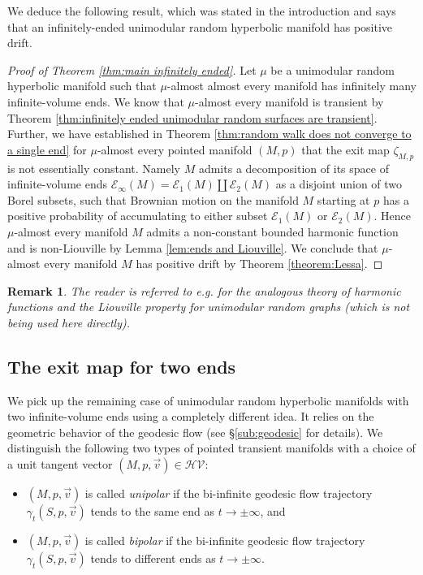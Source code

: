 \documentclass{amsart}
\newcommand{\HypersV}{\mathcal{HV}}
\newcommand{\EndsInf}[1]{\mathcal{E}_{\infty}\left(#1\right)}
\theoremstyle{plain}
\newtheorem{remark}[theorem]{Remark}
\numberwithin{equation}{section}
\theoremstyle{definition}
\begin{document}
We deduce the following result, which was stated in the introduction and says that an infinitely-ended unimodular random hyperbolic manifold has positive drift.

\begin{proof}[Proof of Theorem \ref{thm:main infinitely ended}]
Let $\mu$ be a unimodular random hyperbolic manifold such that  $\mu$-almost almost every manifold has infinitely many infinite-volume ends. We know that $\mu$-almost every manifold is transient by Theorem \ref{thm:infinitely ended unimodular random surfaces are transient}. Further, we have established in Theorem \ref{thm:random walk does not converge to a single end} for $\mu$-almost every pointed manifold $(M,p)$ that the exit map $\zeta_{M,p}$ is not essentially constant. 
Namely $M$ admits a decomposition of its space of infinite-volume ends $\EndsInf{M} = \mathcal{E}_1(M) \amalg \mathcal{E}_2(M)$ as a disjoint union of two Borel subsets, such that Brownian motion  on the manifold $M$ starting at $p$ has a positive probability of accumulating to either subset $\mathcal{E}_1(M)$ or $\mathcal{E}_2(M)$. 
Hence $\mu$-almost every manifold $M$ admits a non-constant bounded harmonic function and is non-Liouville by Lemma \ref{lem:ends and Liouville}. We conclude that $\mu$-almost every manifold $M$ has positive drift by Theorem \ref{theorem:Lessa}.
\end{proof}


\begin{remark}
The reader is referred to e.g. \cite{benjamini2012ergodic,curien2017random} for the analogous theory of harmonic functions and the Liouville property for unimodular random graphs (which is not being used here directly).
\end{remark}

\subsection{The exit map for two ends}
\label{subsec:exit map for 2}

We pick up the remaining case of unimodular random hyperbolic manifolds with two infinite-volume ends using a completely different idea. It relies on the geometric behavior of the geodesic flow (see \S\ref{sub:geodesic} for details). We distinguish the following two types of pointed transient manifolds with a choice of a unit tangent vector $(M,p,\vec v) \in \HypersV$:
\begin{itemize}
    \item $(M,p,\vec v)$ is called \emph{unipolar} if the bi-infinite geodesic flow trajectory $\gamma_t(S,p,\vec v)$  tends to the same end as $t \to \pm \infty$, and
    \item $(M,p,\vec v)$ is called \emph{bipolar} if the bi-infinite geodesic flow trajectory $\gamma_t(S,p,\vec v)$ tends to different ends as $t \to \pm \infty$.
\end{itemize}
\end{document}
